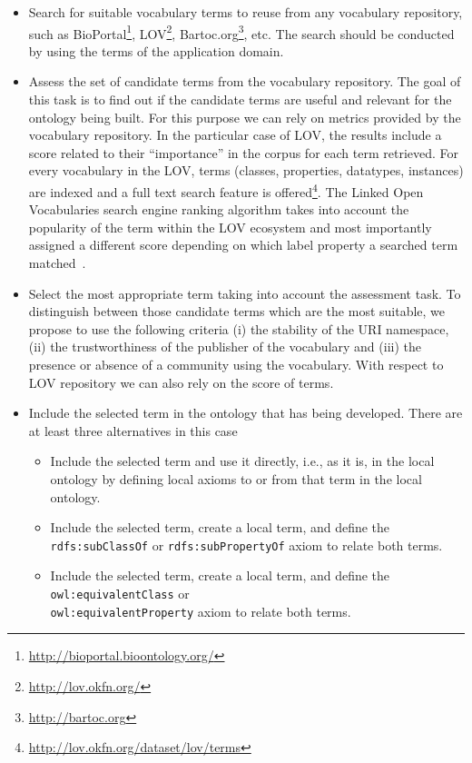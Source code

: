 \begin{itemize}
	\item Search for suitable vocabulary terms to reuse from any vocabulary repository, such as BioPortal\footnote{\url{http://bioportal.bioontology.org/}}, LOV\footnote{\url{http://lov.okfn.org/}}, Bartoc.org\footnote{\url{http://bartoc.org}}, etc. The search should be conducted by using the terms of the application domain.
	\item Assess the set of candidate terms from the vocabulary repository. The goal of this task is to find out if the candidate terms are useful and relevant for the ontology being built. For this purpose we can rely on metrics provided by the vocabulary repository. In the particular case of LOV, the results include a score related to their ``importance'' in the corpus for each term retrieved. For every vocabulary in the LOV, terms (classes, properties, datatypes, instances) are indexed and a full text search feature is offered\footnote{\url{http://lov.okfn.org/dataset/lov/terms}}. The Linked Open Vocabularies search engine ranking algorithm takes  into account the popularity of the term within the LOV ecosystem and most importantly assigned a different score depending on which label property a searched term matched~\cite{vandenbusschelov}.		
	\item Select the most appropriate term taking into account the assessment task. To distinguish between those candidate terms which are the most suitable, we propose to use the following criteria (i) the stability of the URI namespace, (ii) the trustworthiness of the publisher of the vocabulary and (iii) the presence or absence of a community using the vocabulary. With respect to LOV repository we can also rely on the score of terms.
	\item Include the selected term in the ontology that has being developed. There are at least three alternatives in this case 
	\begin{itemize}
		\item Include the selected term and use it directly, i.e., as it is, in the local ontology by defining local axioms to or from that term in the local ontology.
		\item Include the selected term, create a local term, and define the {\tt rdfs:subClassOf} or {\tt rdfs:subPropertyOf} axiom to relate both terms.
		\item Include the selected term, create a local term, and define the {\tt owl:equivalentClass} or \\ {\tt owl:equivalentProperty} axiom to relate both terms. 				
	\end{itemize}
\end{itemize}

